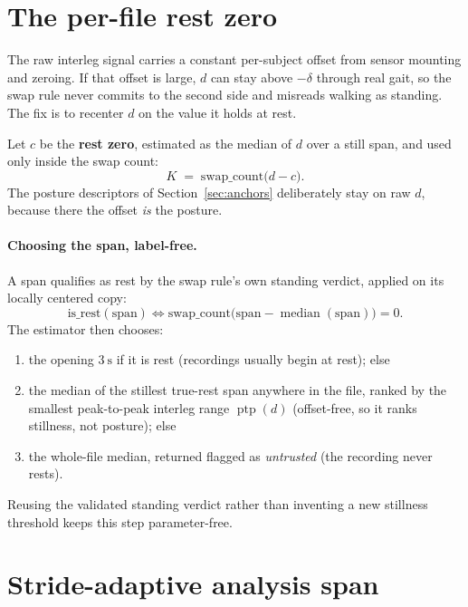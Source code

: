 \documentclass[11pt]{article}
\newcommand{\ileg}{d}                   %
\newcommand{\ptp}{\operatorname{ptp}}
\begin{document}
\section{The per-file rest zero}

The raw interleg signal carries a constant per-subject offset from sensor mounting and
zeroing. If that offset is large, $\ileg$ can stay above $-\delta$ through real gait,
so the swap rule never commits to the second side and misreads walking as standing.
The fix is to recenter $\ileg$ on the value it holds at rest.

Let $c$ be the \textbf{rest zero}, estimated as the median of $\ileg$ over a still span,
and used only inside the swap count:
\begin{equation}
K \;=\; \text{swap\_count}\big(\ileg - c\big).
\end{equation}
The posture descriptors of Section~\ref{sec:anchors} deliberately stay on raw $\ileg$,
because there the offset \emph{is} the posture.

\paragraph{Choosing the span, label-free.} A span qualifies as rest by the swap rule's
own standing verdict, applied on its locally centered copy:
\begin{equation}
\text{is\_rest}(\text{span}) \iff
\text{swap\_count}\big(\text{span} - \operatorname{median}(\text{span})\big) = 0.
\end{equation}
The estimator then chooses:
\begin{enumerate}[leftmargin=2em, itemsep=2pt]
  \item the opening $3~\text{s}$ if it is rest (recordings usually begin at rest); else
  \item the median of the stillest true-rest span anywhere in the file, ranked by the
        smallest peak-to-peak interleg range $\ptp(\ileg)$ (offset-free, so it ranks
        stillness, not posture); else
  \item the whole-file median, returned flagged as \emph{untrusted} (the recording
        never rests).
\end{enumerate}
Reusing the validated standing verdict rather than inventing a new stillness threshold
keeps this step parameter-free.

\section{Stride-adaptive analysis span}
\end{document}
